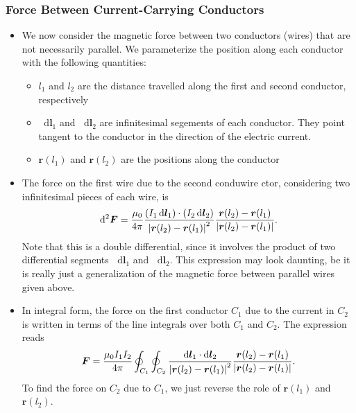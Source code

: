\documentclass[11pt, a4paper]{article}
\newcommand{\diff}{\mathop{}\!\mathrm{d}} %
\renewcommand{\vec}[1]{\bm{#1}} %
\renewcommand{\r}{\vec{r}}
\newcommand{\mm}{\mu_{0}}  %
\begin{document}
\subsubsection{Force Between Current-Carrying Conductors}
\begin{itemize}
	\item We now consider the magnetic force between two conductors (wires) that are not necessarily parallel. We parameterize the position along each conductor with the following quantities:
    \begin{itemize}
        \item $ l_{1} $ and $ l_{2} $ are the distance travelled along the first and second conductor, respectively

        \item $ \diff \vec{l}_{1} $ and $ \diff \vec{l}_{2} $ are infinitesimal segements of each conductor. They point tangent to the conductor in the direction of the electric current.

        \item $ \r(l_{1})  $ and $ \r(l_{2})  $ are the positions along the conductor
    \end{itemize}
    
	\item The force on the first wire due to the second conduwire ctor, considering two infinitesimal pieces of each wire, is
	\begin{equation*}
		\diff^{2}\vec{F} = \frac{\mm}{4\pi}\frac{(I_{1}\diff \vec{l}_{1}) \cdot (I_{2}\diff \vec{l}_{2})}{\abs{\r(l_{2}) - \r(l_{1})}^{2}}\frac{\r(l_{2}) - \r(l_{1})}{\abs{\r(l_{2}) - \r(l_{1})}}.
	\end{equation*}
    Note that this is a double differential, since it involves the product of two differential segments $ \diff \vec{l}_{1} $ and $ \diff \vec{l}_{2} $. This expression may look daunting, be it is really just a generalization of the magnetic force between parallel wires given above.
	
	\item In integral form, the force on the first conductor $ C_{1} $ due to the current in $ C_{2} $ is written in terms of the line integrals over both $ C_{1} $ and $ C_{2} $. The expression reads
	\begin{equation*}
		\vec{F} = \frac{\mm I_{1}I_{2}}{4\pi}\oint_{C_{1}}\oint_{C_{2}}\frac{\diff \vec{l}_{1} \cdot \diff \vec{l}_{2}}{\abs{\r(l_{2}) - \r(l_{1})}^{2}} \frac{\r(l_{2}) - \r(l_{1})}{\abs{\r(l_{2}) - \r(l_{1})}}.
	\end{equation*}
	To find the force on $ C_{2} $ due to $ C_{1} $, we just reverse the role of $ \r(l_{1}) $ and $ \r(l_{2}) $.
	

\end{itemize}
\end{document}
